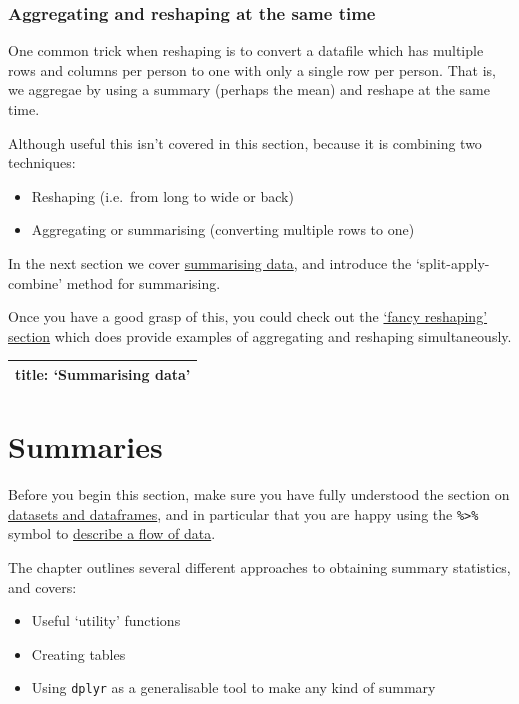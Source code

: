 \documentclass[]{article}
\providecommand{\tightlist}{%
  \setlength{\itemsep}{0pt}\setlength{\parskip}{0pt}}
\theoremstyle{definition}
\theoremstyle{definition}
\theoremstyle{definition}
\theoremstyle{remark}
\begin{document}
\subsubsection*{Aggregating and reshaping at the same
time}\label{aggregating-and-reshaping-at-the-same-time}

One common trick when reshaping is to convert a datafile which has
multiple rows and columns per person to one with only a single row per
person. That is, we aggregae by using a summary (perhaps the mean) and
reshape at the same time.

Although useful this isn't covered in this section, because it is
combining two techniques:

\begin{itemize}
\tightlist
\item
  Reshaping (i.e.~from long to wide or back)
\item
  Aggregating or summarising (converting multiple rows to one)
\end{itemize}

In the next section we cover
\protect\hyperlink{summarising-data}{summarising data}, and introduce
the `split-apply-combine' method for summarising.

Once you have a good grasp of this, you could check out the
\protect\hyperlink{fancy-reshaping}{`fancy reshaping' section} which
does provide examples of aggregating and reshaping simultaneously.

\begin{longtable}[]{@{}l@{}}
\toprule
title: `Summarising data'\tabularnewline
\bottomrule
\end{longtable}

\hypertarget{summarising-data}{\section{Summaries}\label{summarising-data}}

Before you begin this section, make sure you have fully understood the
section on \href{datasets.html}{datasets and dataframes}, and in
particular that you are happy using the \texttt{\%\textgreater{}\%}
symbol to \protect\hyperlink{pipes}{describe a flow of data}.

The chapter outlines several different approaches to obtaining summary
statistics, and covers:

\begin{itemize}
\tightlist
\item
  Useful `utility' functions
\item
  Creating tables
\item
  Using \texttt{dplyr} as a generalisable tool to make any kind of
  summary
\end{itemize}
\end{document}
